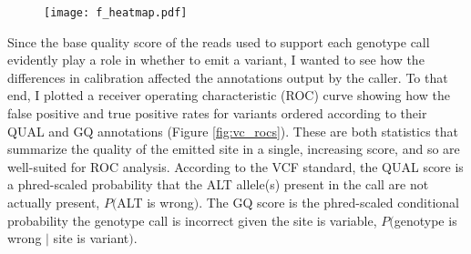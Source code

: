 \begin{figure}
\centering
{}
\label{fig:vc_sens_prech}
\end{figure}

\begin{figure}
\centering
\texttt{[image: f\_heatmap.pdf]}
\label{fig:vc_f_heatmap}
\end{figure}

Since the base quality score of the reads used to support each genotype call evidently play a role in whether to emit a variant, I wanted to see how the differences in calibration affected the annotations output by the caller. To that end, I plotted a receiver operating characteristic (ROC) curve showing how the false positive and true positive rates for variants ordered according to their QUAL and GQ annotations (Figure \ref{fig:vc_rocs}). These are both statistics that summarize the quality of the emitted site in a single, increasing score, and so are well-suited for ROC analysis. According to the VCF standard, the QUAL score is a phred-scaled probability that the ALT allele(s) present in the call are not actually present, $P($ALT is wrong$)$. The GQ score is the phred-scaled conditional probability the genotype call is incorrect given the site is variable, $P($genotype is wrong $|$ site is variant$)$.

